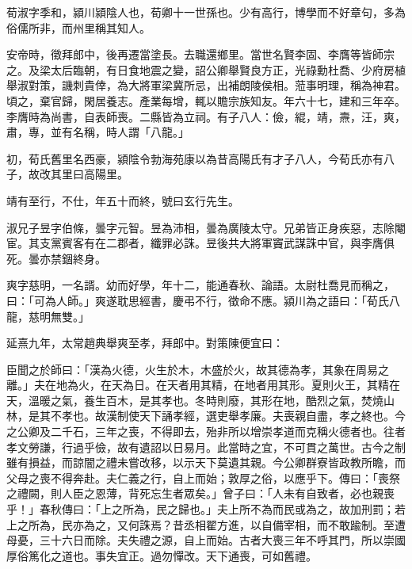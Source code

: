 
\begin{pinyinscope}
荀淑字季和，潁川潁陰人也，荀卿十一世孫也。少有高行，博學而不好章句，多為俗儒所非，而州里稱其知人。

安帝時，徵拜郎中，後再遷當塗長。去職還鄉里。當世名賢李固、李膺等皆師宗之。及梁太后臨朝，有日食地震之變，詔公卿舉賢良方正，光祿勳杜喬、少府房植舉淑對策，譏刺貴倖，為大將軍梁冀所忌，出補朗陵侯相。蒞事明理，稱為神君。頃之，棄官歸，閑居養志。產業每增，輒以贍宗族知友。年六十七，建和三年卒。李膺時為尚書，自表師喪。二縣皆為立祠。有子八人：儉，緄，靖，燾，汪，爽，肅，專，並有名稱，時人謂「八龍。」

初，荀氏舊里名西豪，潁陰令勃海苑康以為昔高陽氏有才子八人，今荀氏亦有八子，故改其里曰高陽里。

靖有至行，不仕，年五十而終，號曰玄行先生。

淑兄子昱字伯條，曇字元智。昱為沛相，曇為廣陵太守。兄弟皆正身疾惡，志除閹宦。其支黨賓客有在二郡者，纖罪必誅。昱後共大將軍竇武謀誅中官，與李膺俱死。曇亦禁錮終身。

爽字慈明，一名諝。幼而好學，年十二，能通春秋、論語。太尉杜喬見而稱之，曰：「可為人師。」爽遂耽思經書，慶弔不行，徵命不應。潁川為之語曰：「荀氏八龍，慈明無雙。」

延熹九年，太常趙典舉爽至孝，拜郎中。對策陳便宜曰：

臣聞之於師曰：「漢為火德，火生於木，木盛於火，故其德為孝，其象在周易之離。」夫在地為火，在天為日。在天者用其精，在地者用其形。夏則火王，其精在天，溫暖之氣，養生百木，是其孝也。冬時則廢，其形在地，酷烈之氣，焚燒山林，是其不孝也。故漢制使天下誦孝經，選吏舉孝廉。夫喪親自盡，孝之終也。今之公卿及二千石，三年之喪，不得即去，殆非所以增崇孝道而克稱火德者也。往者孝文勞謙，行過乎儉，故有遺詔以日易月。此當時之宜，不可貫之萬世。古今之制雖有損益，而諒闇之禮未嘗改移，以示天下莫遺其親。今公卿群寮皆政教所瞻，而父母之喪不得奔赴。夫仁義之行，自上而始；敦厚之俗，以應乎下。傳曰：「喪祭之禮闕，則人臣之恩薄，背死忘生者眾矣。」曾子曰：「人未有自致者，必也親喪乎！」春秋傳曰：「上之所為，民之歸也。」夫上所不為而民或為之，故加刑罰；若上之所為，民亦為之，又何誅焉？昔丞相翟方進，以自備宰相，而不敢踰制。至遭母憂，三十六日而除。夫失禮之源，自上而始。古者大喪三年不呼其門，所以崇國厚俗篤化之道也。事失宜正。過勿憚改。天下通喪，可如舊禮。


\end{pinyinscope}
